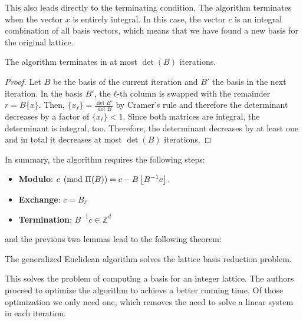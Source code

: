This also leads directly to the terminating condition.
The algorithm terminates when the vector $x$ is entirely integral.
In this case, the vector $c$ is an integral combination of all basis vectors,
which means that we have found a new basis for the original lattice.

\begin{lemma}
  \label{lem:termination}
  The algorithm terminates in at most $\det(B)$ iterations.
\end{lemma}

\begin{proof}
  Let $B$ be the basis of the current iteration
  and $B'$ the basis in the next iteration.
  In the basis $B'$, the $ℓ$-th column is swapped with the remainder $r = B\{x\}$.
  Then, $\{x_ℓ\} = \frac{\det B'}{\det B}$ by Cramer's rule
  and therefore the determinant decreases by a factor of $\{x_ℓ\} < 1$.
  Since both matrices are integral, the determinant is integral, too.
  Therefore, the determinant decreases by at least one and in total it
  decreases at most $\det(B)$ iterations.
\end{proof}

In summary, the algorithm requires the following steps:
\begin{itemize}
  \item \textbf{Modulo}: $c \pmod{\Pi(B)} = c - B \left\lfloor B^{-1} c\right\rfloor$.
  \item \textbf{Exchange}: $c = B_ℓ$
  \item \textbf{Termination}: $B^{-1} c ∈ ℤ^d$
\end{itemize}
and the previous two lemmas lead to the following theorem:

\begin{theorem}
  The generalized Euclidean algorithm solves the lattice basis reduction problem.
\end{theorem}

This solves the problem of computing a basis for an integer lattice.
The authors proceed to optimize the algorithm to achieve a better running time.
Of those optimization we only need one, which removes the need to solve a linear
system in each iteration.

